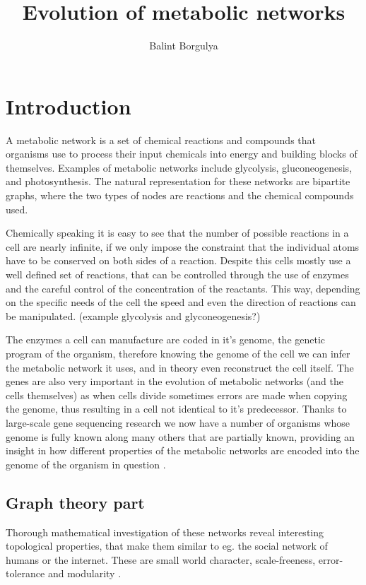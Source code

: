\documentclass[10pt,a4paper]{article}
\title{Evolution of metabolic networks}
\author{Balint Borgulya}
\begin{document}
	
	
	
	\maketitle
	
	\begin{abstract}
		
	\end{abstract}
	
	\section{Introduction}

	A metabolic network is a set of chemical reactions and compounds that organisms use to process their input chemicals into energy and building blocks of themselves. Examples of metabolic networks include glycolysis, gluconeogenesis, and photosynthesis. The natural representation for these networks are bipartite graphs, where the two types of nodes are reactions and the chemical compounds used. 
	
	Chemically speaking it is easy to see that the number of possible reactions in a cell are nearly infinite, if we only impose the constraint that the individual atoms have to be conserved on both sides of a reaction.  Despite this cells mostly use a well defined set of reactions, that can be controlled through the use of enzymes and the careful control of the concentration of the reactants. This way, depending on the specific needs of the cell the speed and even the direction of reactions can be manipulated. (example glycolysis and glyconeogenesis?)
	
	The enzymes a cell can manufacture are coded in it's genome, the genetic program of the organism, therefore knowing the genome of the cell we can infer the metabolic network it uses, and in theory even reconstruct the cell itself. The genes are also very important in the evolution of metabolic networks (and the cells themselves) as when cells divide sometimes errors are made when copying the genome, thus resulting in a cell not identical to it's predecessor.  Thanks to large-scale gene sequencing research \cite{20yearsof} we now have a number of organisms whose genome is fully known along many others that are partially known, providing an insight in how different properties of the metabolic networks are encoded into the genome of the organism in question \cite{sequencing}. 
	
	\subsection{Graph theory part}
	Thorough mathematical investigation of these networks reveal interesting topological properties, that make them similar to eg. the social network of humans or the internet. These are small world character, scale-freeness, error-tolerance \cite{largescale} and modularity .
	
\end{document}
